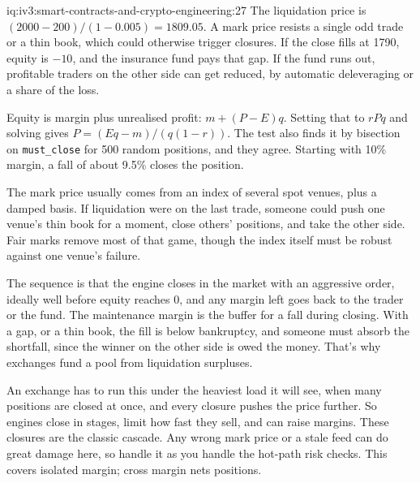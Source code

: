 \begin{solution}{iq:iv3:smart-contracts-and-crypto-engineering:27}
The liquidation price is $(2000 - 200) / (1 - 0.005) = 1809.05$. A mark price resists a single odd trade or a thin book, which could otherwise trigger closures. If the close fills at 1790, equity is $-10$, and the insurance fund pays that gap. If the fund runs out, profitable traders on the other side can get reduced, by automatic deleveraging or a share of the loss.
\enlargethispage{-4\baselineskip}%
\label{lst:iv3:cr:liquidation}

Equity is margin plus unrealised profit: $m + (P - E) q$. Setting that to $r P q$ and solving gives $P = (E q - m) / (q (1 - r))$. The test also finds it by bisection on \texttt{must\_close} for 500 random positions, and they agree. Starting with 10\% margin, a fall of about 9.5\% closes the position.

The mark price usually comes from an index of several spot venues, plus a damped basis. If liquidation were on the last trade, someone could push one venue's thin book for a moment, close others' positions, and take the other side. Fair marks remove most of that game, though the index itself must be robust against one venue's failure.

The sequence is that the engine closes in the market with an aggressive order, ideally well before equity reaches 0, and any margin left goes back to the trader or the fund. The maintenance margin is the buffer for a fall during closing. With a gap, or a thin book, the fill is below bankruptcy, and someone must absorb the shortfall, since the winner on the other side is owed the money. That's why exchanges fund a pool from liquidation surpluses.

An exchange has to run this under the heaviest load it will see, when many positions are closed at once, and every closure pushes the price further. So engines close in stages, limit how fast they sell, and can raise margins. These closures are the classic cascade. Any wrong mark price or a stale feed can do great damage here, so handle it as you handle the hot-path risk checks. This covers isolated margin; cross margin nets positions.

\end{solution}

